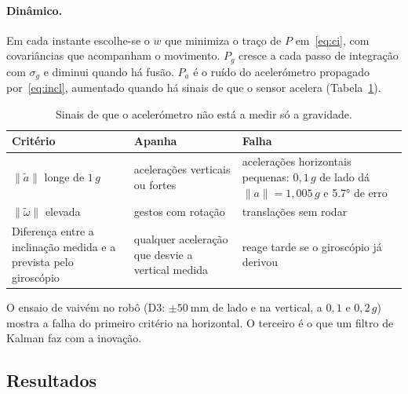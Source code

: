 \paragraph{Dinâmico.} Em cada instante escolhe-se o $w$ que minimiza o traço
de $P$ em~\eqref{eq:ci}, com covariâncias que acompanham o movimento.
$P_g$ cresce a cada passo de integração com $\sigma_g$ e diminui quando há
fusão. $P_a$ é o ruído do acelerómetro propagado por~\eqref{eq:incl},
aumentado quando há sinais de que o sensor acelera
(Tabela~\ref{tab:criterios}).

\begin{table}[H]
\centering
\caption{Sinais de que o acelerómetro não está a medir só a gravidade.}
\label{tab:criterios}
\small
\begin{tabular}{p{}p{}p{}}
\toprule
\rowcolor{tabcab}
Critério & Apanha & Falha \\
\midrule
$\lVert\tilde a\rVert$ longe de $1\,g$ & acelerações verticais ou fortes &
acelerações horizontais pequenas: $0{,}1\,g$ de lado dá $\lVert a\rVert =
1{,}005\,g$ e \ang{5.7} de erro \\
$\lVert\tilde\omega\rVert$ elevada & gestos com rotação & translações sem
rodar \\
Diferença entre a inclinação medida e a prevista pelo giroscópio & qualquer
aceleração que desvie a vertical medida & reage tarde se o giroscópio já
derivou \\
\bottomrule
\end{tabular}
\end{table}

O ensaio de vaivém no robô (D3: $\pm\SI{50}{\milli\meter}$ de lado e na
vertical, a $0{,}1$ e $0{,}2\,g$) mostra a falha do primeiro critério na
horizontal. O terceiro é o que um filtro de Kalman faz com a inovação.

\subsection{Resultados}

\begin{figure}[H]
\centering
{}
\caption{}
\label{fig:fusao}
\end{figure}

